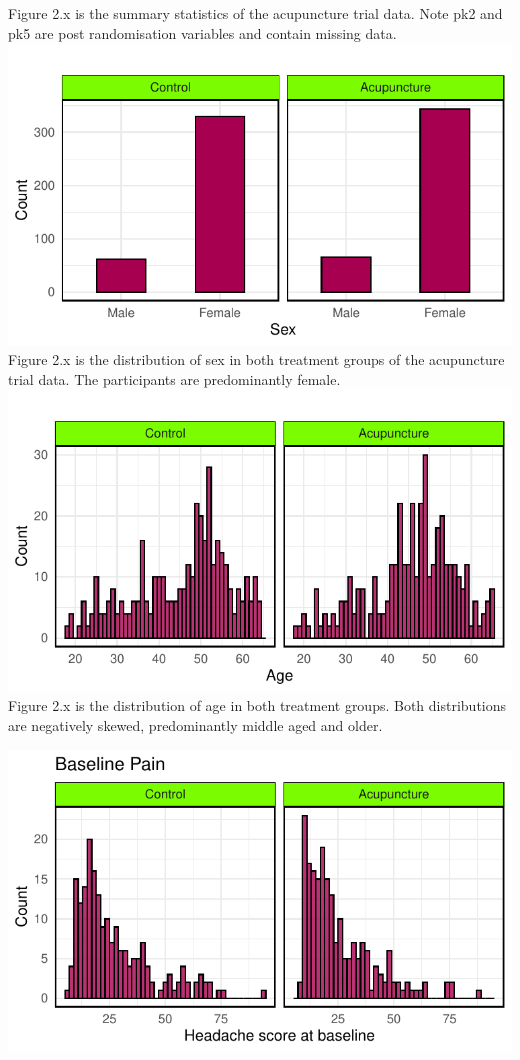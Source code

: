 \documentclass{article}
\newcommand{\pandocbounded}[1]{#1}
\begin{document}
Figure 2.x is the summary statistics of the acupuncture trial data. Note
pk2 and pk5 are post randomisation variables and contain missing data.
\pandocbounded{\includegraphics[keepaspectratio]{Final_Report_files/figure-latex/unnamed-chunk-4-1.pdf}}
Figure 2.x is the distribution of sex in both treatment groups of the
acupuncture trial data. The participants are predominantly female.
\pandocbounded{\includegraphics[keepaspectratio]{Final_Report_files/figure-latex/unnamed-chunk-5-1.pdf}}
Figure 2.x is the distribution of age in both treatment groups. Both
distributions are negatively skewed, predominantly middle aged and
older.

\begin{center}\includegraphics{Final_Report_files/figure-latex/unnamed-chunk-6-1} \end{center}
\end{document}
